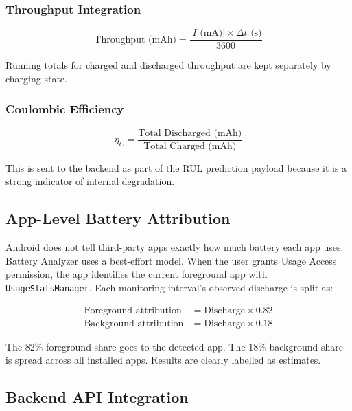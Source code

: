 \documentclass[12pt,a4paper]{report}
\begin{document}
\subsubsection{Throughput Integration}

\begin{equation}
  \text{Throughput (mAh)} = \frac{|I \text{ (mA)}| \times \Delta t \text{ (s)}}{3600}
\end{equation}

Running totals for charged and discharged throughput are kept separately by
charging state.

\subsubsection{Coulombic Efficiency}

\begin{equation}
  \eta_C = \frac{\text{Total Discharged (mAh)}}{\text{Total Charged (mAh)}}
\end{equation}

This is sent to the backend as part of the RUL prediction payload because it is a
strong indicator of internal degradation.

\subsection{App-Level Battery Attribution}

Android does not tell third-party apps exactly how much battery each app uses.
Battery Analyzer uses a best-effort model. When the user grants Usage Access
permission, the app identifies the current foreground app with
\texttt{UsageStatsManager}. Each monitoring interval's observed discharge is split as:

\begin{align}
  \text{Foreground attribution} &= \text{Discharge} \times 0.82\\
  \text{Background attribution} &= \text{Discharge} \times 0.18
\end{align}

The 82\% foreground share goes to the detected app. The 18\% background share is
spread across all installed apps. Results are clearly labelled as estimates.

\subsection{Backend API Integration}
\end{document}
